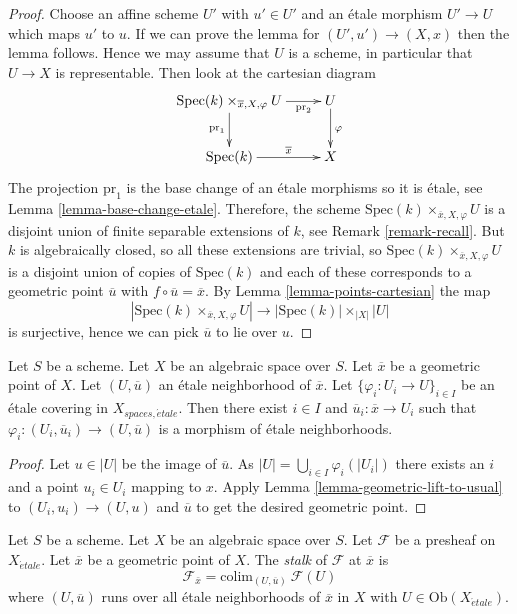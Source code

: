 \begin{proof}
Choose an affine scheme $U'$ with $u' \in U'$ and an \'etale morphism
$U' \to U$ which maps $u'$ to $u$. If we can prove the lemma for
$(U', u') \to (X, x)$ then the lemma follows. Hence we may assume that
$U$ is a scheme, in particular that $U \to X$ is representable.
Then look at the cartesian diagram
$$
\xymatrix{
\text{Spec}(k) \times_{\overline{x}, X, \varphi} U
\ar[d]_{\text{pr}_1} \ar[r]_-{\text{pr}_2} & U
\ar[d]^\varphi \\
\text{Spec}(k) \ar[r]^-{\overline{x}} & X
}
$$
The projection $\text{pr}_1$ is the base change of an \'etale morphisms
so it is \'etale, see
Lemma \ref{lemma-base-change-etale}.
Therefore, the scheme $\text{Spec}(k) \times_{\overline{x}, X, \varphi} U$
is a disjoint union of finite separable extensions of $k$, see
Remark \ref{remark-recall}.
But $k$ is algebraically closed, so all these extensions are trivial,
so $\text{Spec}(k) \times_{\overline{x}, X, \varphi} U$
is a disjoint union of copies of $\text{Spec}(k)$ and each of
these corresponds to a geometric point $\overline{u}$ with
$f \circ \overline{u} = \overline{x}$. By
Lemma \ref{lemma-points-cartesian}
the map
$$
|\text{Spec}(k) \times_{\overline{x}, X, \varphi} U|
\longrightarrow
|\text{Spec}(k)| \times_{|X|} |U|
$$
is surjective, hence we can pick $\overline{u}$ to lie over $u$.
\end{proof}

\begin{lemma}
\label{lemma-geometric-lift-to-cover}
Let $S$ be a scheme. Let $X$ be an algebraic space over $S$.
Let $\overline{x}$ be a geometric point of $X$.
Let $(U, \overline{u})$ an \'etale neighborhood of $\overline{x}$.
Let $\{\varphi_i : U_i \to U\}_{i \in I}$ be an \'etale covering in
$X_{spaces, \acute{e}tale}$.
Then there exist $i \in I$ and $\overline{u}_i : \overline{x} \to U_i$
such that $\varphi_i : (U_i, \overline{u}_i) \to (U, \overline{u})$
is a morphism of \'etale neighborhoods.
\end{lemma}

\begin{proof}
Let $u \in |U|$ be the image of $\overline{u}$.
As $|U| = \bigcup_{i \in I} \varphi_i(|U_i|)$ there exists an
$i$ and a point $u_i \in U_i$ mapping to $x$. Apply
Lemma \ref{lemma-geometric-lift-to-usual}
to $(U_i, u_i) \to (U, u)$ and $\overline{u}$ to
get the desired geometric point.
\end{proof}

\begin{definition}
\label{definition-stalk}
Let $S$ be a scheme. Let $X$ be an algebraic space over $S$.
Let $\mathcal{F}$ be a presheaf on $X_{\acute{e}tale}$.
Let $\overline{x}$ be a geometric point of $X$.
The {\it stalk} of $\mathcal{F}$ at $\overline{x}$ is
$$
\mathcal{F}_{\bar x}
=
\text{colim}_{(U, \overline{u})}\ \mathcal{F}(U)
$$
where $(U, \overline{u})$ runs over all \'etale neighborhoods
of $\overline{x}$ in $X$ with $U \in \text{Ob}(X_{\acute{e}tale})$.
\end{definition}

